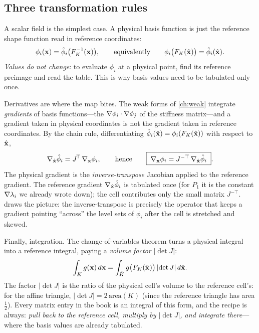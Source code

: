 \subsection{Three transformation rules}

A scalar field is the simplest case. A physical basis function is just the reference
shape function read in reference coordinates:
\[
  \phi_i(\mathbf{x}) = \hat\phi_i\bigl(F_K^{-1}(\mathbf{x})\bigr),
  \qquad\text{equivalently}\qquad
  \phi_i\bigl(F_K(\hat{\mathbf{x}})\bigr) = \hat\phi_i(\hat{\mathbf{x}}).
\]
\emph{Values do not change}: to evaluate $\phi_i$ at a physical point, find its
reference preimage and read the table. This is why basis values need to be tabulated
only once.

Derivatives are where the map bites. The weak forms of \cref{ch:weak} integrate
\emph{gradients} of basis functions---the $\nabla\phi_i\cdot\nabla\phi_j$ of the
stiffness matrix---and a gradient taken in physical coordinates is not the gradient
taken in reference coordinates. By the chain rule, differentiating
$\hat\phi_i(\hat{\mathbf{x}})=\phi_i(F_K(\hat{\mathbf{x}}))$ with respect to $\hat{\mathbf{x}}$,
\[
  \nabla_{\hat{\mathbf{x}}}\hat\phi_i = J^{\!\top}\,\nabla_{\mathbf{x}}\phi_i,
  \qquad\text{hence}\qquad
  \boxed{\;\nabla_{\mathbf{x}}\phi_i = J^{-\top}\,\nabla_{\hat{\mathbf{x}}}\hat\phi_i\;}.
\]
The physical gradient is the \emph{inverse-transpose} Jacobian applied to the
reference gradient. The reference gradient $\nabla_{\hat{\mathbf{x}}}\hat\phi_i$ is tabulated
once (for $P_1$ it is the constant $\nabla\lambda_i$ we already wrote down); the cell
contributes only the small matrix $J^{-\top}$.  draws the picture:
the inverse-transpose is precisely the operator that keeps a gradient pointing
``across'' the level sets of $\phi_i$ after the cell is stretched and skewed.

Finally, integration. The change-of-variables theorem turns a physical integral into
a reference integral, paying a \emph{volume factor} $|\det J|$:
\[
  \int_K g(\mathbf{x})\,d\mathbf{x} = \int_{\hat K} g\bigl(F_K(\hat{\mathbf{x}})\bigr)\,\lvert\det J\rvert\,d\hat{\mathbf{x}} .
\]
The factor $|\det J|$ is the ratio of the physical cell's volume to the reference
cell's: for the affine triangle, $|\det J| = 2\,\mathrm{area}(K)$ (since the reference
triangle has area $\tfrac12$). Every matrix entry in the book is an integral of this
form, and the recipe is always: \emph{pull back to the reference cell, multiply by
$|\det J|$, and integrate there}---where the basis values are already tabulated.

